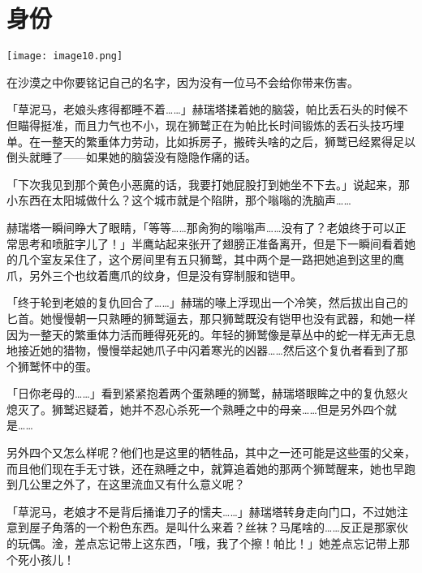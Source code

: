 \chapter{身份}

\texttt{[image: image10.png]}

\begin{intro}
在沙漠之中你要铭记自己的名字，因为没有一位马不会给你带来伤害。
\end{intro}


「草泥马，老娘头疼得都睡不着……」赫瑞塔揉着她的脑袋，帕比丢石头的时候不但瞄得挺准，而且力气也不小，现在狮鹫正在为帕比长时间锻炼的丢石头技巧埋单。在一整天的繁重体力劳动，比如拆房子，搬砖头啥的之后，狮鹫已经累得足以倒头就睡了——如果她的脑袋没有隐隐作痛的话。

「下次我见到那个黄色小恶魔的话，我要打她屁股打到她坐不下去。」说起来，那小东西在太阳城做什么？这个城市就是个陷阱，那个嗡嗡的洗脑声……

赫瑞塔一瞬间睁大了眼睛，「等等……那肏狗的嗡嗡声……没有了？老娘终于可以正常思考和喷脏字儿了！」半鹰站起来张开了翅膀正准备离开，但是下一瞬间看着她的几个室友呆住了，这个房间里有五只狮鹫，其中两个是一路把她追到这里的鹰爪，另外三个也纹着鹰爪的纹身，但是没有穿制服和铠甲。

「终于轮到老娘的复仇回合了……」赫瑞的喙上浮现出一个冷笑，然后拔出自己的匕首。她慢慢朝一只熟睡的狮鹫逼去，那只狮鹫既没有铠甲也没有武器，和她一样因为一整天的繁重体力活而睡得死死的。年轻的狮鹫像是草丛中的蛇一样无声无息地接近她的猎物，慢慢举起她爪子中闪着寒光的凶器……然后这个复仇者看到了那个狮鹫怀中的蛋。

「日你老母的……」看到紧紧抱着两个蛋熟睡的狮鹫，赫瑞塔眼眸之中的复仇怒火熄灭了。狮鹫迟疑着，她并不忍心杀死一个熟睡之中的母亲……但是另外四个就是……

另外四个又怎么样呢？他们也是这里的牺牲品，其中之一还可能是这些蛋的父亲，而且他们现在手无寸铁，还在熟睡之中，就算追着她的那两个狮鹫醒来，她也早跑到几公里之外了，在这里流血又有什么意义呢？

「草泥马，老娘才不是背后捅谁刀子的懦夫……」赫瑞塔转身走向门口，不过她注意到屋子角落的一个粉色东西。是叫什么来着？丝袜？马尾啥的……反正是那家伙的玩偶。淦，差点忘记带上这东西，「哦，我了个擦！帕比！」她差点忘记带上那个死小孩儿！

\horizonline


